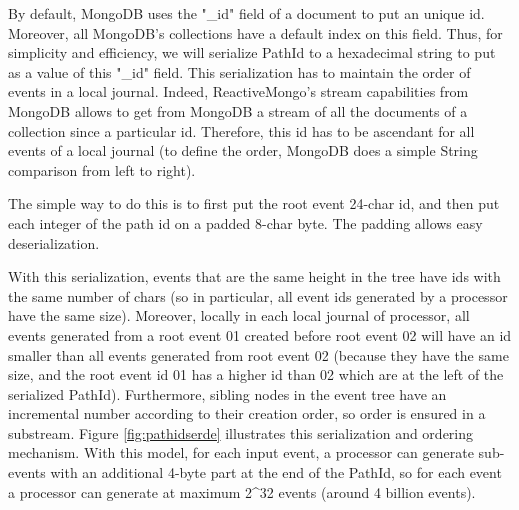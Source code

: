 By default, MongoDB uses the "_id" field of a document to put an unique id. Moreover, all MongoDB's collections have a default index on this field. Thus,
for simplicity and efficiency, we will serialize PathId to a hexadecimal string to put as a value of this "_id" field. This serialization has to maintain the order
of events in a local journal. Indeed, ReactiveMongo's stream capabilities from MongoDB allows to get from MongoDB a stream of all the documents of a collection since a particular id. Therefore, this id has to be ascendant for all events of a local journal (to define the order, MongoDB does a simple String comparison from left to right).

The simple way to do this is to first put the root event 24-char id, and then put each integer of the path id on a padded 8-char byte. The padding allows easy deserialization.

With this serialization, events that are the same height in the tree have ids with the same number of chars (so in particular, all event ids generated by a processor have the same size). Moreover, locally in each local journal of processor, all events generated from a root event 01 created before root event 02 will have an id smaller than all events
generated from root event 02 (because they have the same size, and the root event id 01 has a higher id than 02 which are at the left of the serialized PathId). Furthermore,
sibling nodes in the event tree have an incremental number according to their creation order, so order is ensured in a substream. Figure \ref{fig:pathidserde} illustrates this serialization and ordering mechanism. With this model, for each input event, a processor can generate sub-events with an additional 4-byte part at the end of the PathId, so
for each event a processor can generate at maximum 2^32 events (around 4 billion events).

